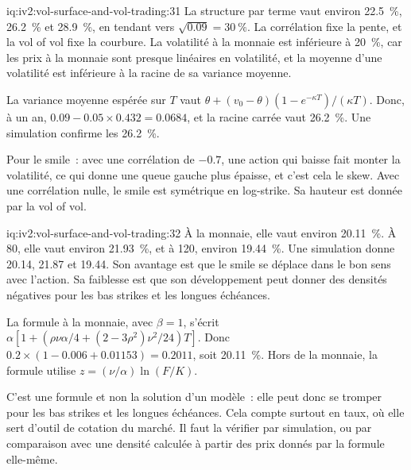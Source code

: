 \begin{solution}{iq:iv2:vol-surface-and-vol-trading:31}
La structure par terme vaut environ 22.5~\%, 26.2~\% et 28.9~\%, en tendant vers $\sqrt{0.09} = 30~\%$. La corrélation fixe la pente, et la vol of vol fixe la courbure. La volatilité à la monnaie est inférieure à 20~\%, car les prix à la monnaie sont presque linéaires en volatilité, et la moyenne d'une volatilité est inférieure à la racine de sa variance moyenne.

La variance moyenne espérée sur $T$ vaut $\theta + (v_0 - \theta)(1 - e^{-\kappa T})/(\kappa T)$. Donc, à un an, $0.09 - 0.05 \times 0.432 = 0.0684$, et la racine carrée vaut 26.2~\%. Une simulation confirme les 26.2~\%.

Pour le smile~: avec une corrélation de $-0.7$, une action qui baisse fait monter la volatilité, ce qui donne une queue gauche plus épaisse, et c'est cela le skew. Avec une corrélation nulle, le smile est symétrique en log-strike. Sa hauteur est donnée par la vol of vol.

\end{solution}

\begin{solution}{iq:iv2:vol-surface-and-vol-trading:32}
À la monnaie, elle vaut environ 20.11~\%. À 80, elle vaut environ 21.93~\%, et à 120, environ 19.44~\%. Une simulation donne 20.14, 21.87 et 19.44. Son avantage est que le smile se déplace dans le bon sens avec l'action. Sa faiblesse est que son développement peut donner des densités négatives pour les bas strikes et les longues échéances.

La formule à la monnaie, avec $\beta = 1$, s'écrit $\alpha[1 + (\rho\nu\alpha/4 + (2 - 3\rho^2)\nu^2/24)T]$. Donc $0.2 \times (1 - 0.006 + 0.01153) = 0.2011$, soit 20.11~\%. Hors de la monnaie, la formule utilise $z = (\nu/\alpha)\ln(F/K)$.

C'est une formule et non la solution d'un modèle~: elle peut donc se tromper pour les bas strikes et les longues échéances. Cela compte surtout en taux, où elle sert d'outil de cotation du marché. Il faut la vérifier par simulation, ou par comparaison avec une densité calculée à partir des prix donnés par la formule elle-même.

\end{solution}

